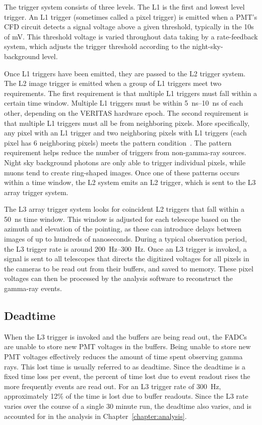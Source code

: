 The trigger system consists of three levels.
The L1 is the first and lowest level trigger.
An L1 trigger (sometimes called a pixel trigger) is emitted when a PMT's CFD circuit detects a signal voltage above a given threshold, typically in the 10s of mV.
This threshold voltage is varied throughout data taking by a rate-feedback system, which adjusts the trigger threshold according to the night-sky-background level.

Once L1 triggers have been emitted, they are passed to the L2 trigger system.
The L2 image trigger is emitted when a group of L1 triggers meet two requirements.
The first requirement is that multiple L1 triggers must fall within a certain time window.
Multiple L1 triggers must be within \SIrange{5}{10}{ns} of each other, depending on the VERITAS hardware epoch.
The second requirement is that multiple L1 triggers must all be from neighboring pixels.
More specifically, any pixel with an L1 trigger and two neighboring pixels with L1 triggers (each pixel has 6 neighboring pixels) meets the pattern condition~\cite{veritas_v6_trigger}.
The pattern requirement helps reduce the number of triggers from non-gamma-ray sources.
Night sky background photons are only able to trigger individual pixels, while muons tend to create ring-shaped images.
Once one of these patterns occurs within a time window, the L2 system emits an L2 trigger, which is sent to the L3 array trigger system.

The L3 array trigger system looks for coincident L2 triggers that fall within a \nicetilde\SI{50}{ns} time window.
This window is adjusted for each telescope based on the azimuth and elevation of the pointing, as these can introduce delays between images of up to hundreds of nanoseconds.
During a typical observation period, the L3 trigger rate is around \SIrange{200}{300}{Hz}.
Once an L3 trigger is invoked, a signal is sent to all telescopes that directs the digitized voltages for all pixels in the cameras to be read out from their buffers, and saved to memory.
These pixel voltages can then be processed by the analysis software to reconstruct the gamma-ray events.



\subsection{Deadtime}
When the L3 trigger is invoked and the buffers are being read out, the FADCs are unable to store new PMT voltages in the buffers.
Being unable to store new PMT voltages effectively reduces the amount of time spent observing gamma rays.
This lost time is usually referred to as deadtime.
Since the deadtime is a fixed time loss per event, the percent of time lost due to event readout rises the more frequently events are read out.
For an L3 trigger rate of \nicetilde{}\SI{300}{Hz}, approximately 12\% of the time is lost due to buffer readouts.
Since the L3 rate varies over the course of a single 30 minute run, the deadtime also varies, and is accounted for in the analysis in Chapter~\ref{chapter:analysis}.

